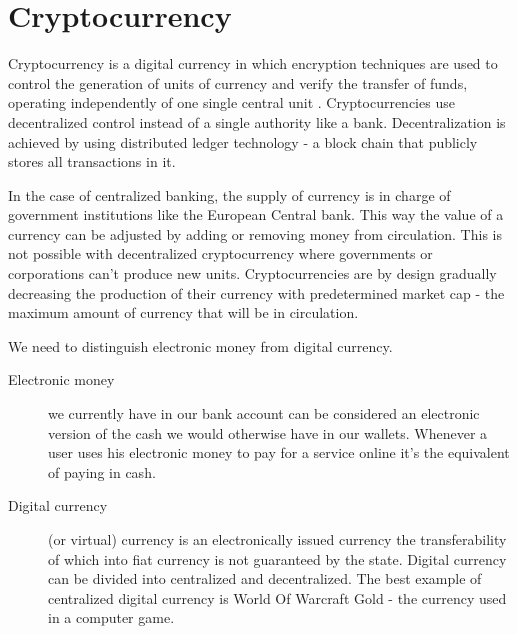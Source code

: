 \section{Cryptocurrency}
Cryptocurrency is a digital currency in which encryption techniques are used to control the generation of units of currency and verify the transfer of funds, operating independently of one single central unit  \cite{fintech_compendium}. Cryptocurrencies use decentralized control instead of a single authority like a bank. Decentralization is achieved by using distributed ledger technology - a block chain that publicly stores all transactions in it. 

In the case of centralized banking, the supply of currency is in charge of government institutions like the European Central bank. This way the value of a currency can be adjusted by adding or removing money from circulation. This is not possible with decentralized cryptocurrency where governments or corporations can't produce new units. Cryptocurrencies are by design gradually decreasing the production of their currency with predetermined market cap - the maximum amount of currency that will be in circulation. 

We need to distinguish electronic money from digital currency. 
\begin{description}
\item[Electronic money]
we currently have in our bank account can be considered an electronic version of the cash we would otherwise have in our wallets. Whenever a user uses his electronic money to pay for a service online it's the equivalent of paying in cash. \item[Digital currency]  (or virtual) currency is an electronically issued currency the transferability of which into  fiat currency is not guaranteed by the state. Digital currency can be divided into centralized and decentralized. The best example of centralized digital currency is World Of Warcraft Gold  - the currency used in a computer game.
\end{description}
